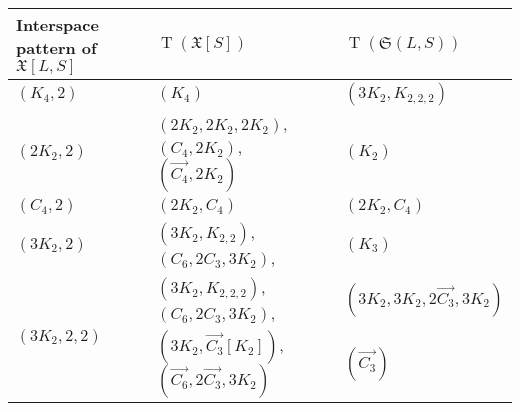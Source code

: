 \documentclass[english,a4paper]{article}
\theoremstyle{plain}
\theoremstyle{definition}
\newcommand{\coherentConfig}{\ensuremath{\mathfrak{X}}}
\newcommand{\interspace}[2]{\ensuremath{\coherentConfig[#1,#2]}}
\newcommand{\inducedCC}[1]{\ensuremath{\coherentConfig[#1]}}
\DeclareMathOperator*{\Type}{T}
\newcommand{\type}[1]{\ensuremath{\Type\left(#1\right)}}
\newcommand{\partitionStructure}[1]{\ensuremath{\mathfrak{S}(#1)}}
\newcommand{\ipfourClique}  {\ensuremath{(\clique{4},2)}}
\newcommand{\ipfourMatching}{\ensuremath{(\disjointCliques{2}{2},2)}}
\newcommand{\ipfourCycle}   {\ensuremath{(\cycle{4},2)}}
\newcommand{\ipsixMatching}             {\ensuremath{(\disjointCliques{3}{2},2)}}
\newcommand{\ipsixMatchingTwice}        {\ensuremath{(\disjointCliques{3}{2},2,2)}}
\newcommand{\clique}[1]{\ensuremath{K_{#1}}}
\newcommand{\cycle}[1]{\ensuremath{C_{#1}}}
\newcommand{\disjointCliques}[2]{\ensuremath{#1 \clique{#2}}}
\begin{document}
\begin{table}[tb]
    \centering{}\begin{tabular}{|l|l|l|}
        \hline
        \makecell{Interspace pattern \\ of~$\interspace{L}{S}$} & $\type{\inducedCC{S}}$                                                                                                                                                                    & $\type{\partitionStructure{L,S}}$                                     \\ \hline
        $\ipfourClique$                                         & $(K_4)$                                                                                                                                                                                   & $(3K_2,K_{2,2,2})$                                                    \\ \hline
        $\ipfourMatching$                                       & $(2K_2,2K_2,2K_2)$, $(C_4,2K_2)$, $(\overrightarrow{C_4},2K_2)$                                                                                                                           & $(K_2)$                                                              \\ \hline
        $\ipfourCycle$                                          & $(2K_2,C_4)$                                                                                                                                                                              & $(2K_2,C_4)$                                                          \\ \hline
        $\ipsixMatching$                                        & $(3K_2,K_{2,2})$, $(C_6,2C_3,3K_2)$,                                                                                                                                                      & $(K_3)$                                                              \\ \hline
        \multirow{2}{*}{$\ipsixMatchingTwice$}                  & $(3K_2,K_{2,2,2})$, $(C_6,2C_3,3K_2)$,                                                                                                                                                      & $(3K_2,3K_2,2\overrightarrow{C_3},3K_2)$                                                    \\ \cline{2-3}
                                                                & $(3K_2,\overrightarrow{C_3}[K_2])$, $(\overrightarrow{C_6},2\overrightarrow{C_3},3K_2)$                                                                                                   & $(\overrightarrow{C_3})$                                              \\ \hline

\end{tabular}
\end{table}
\end{document}
